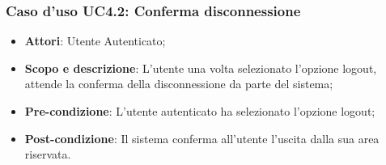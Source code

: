 \subsubsection{Caso d'uso UC4.2: Conferma disconnessione}
	\begin{itemize}
		\item
			\textbf{Attori}: Utente Autenticato;
		\item
			\textbf{Scopo e descrizione}: L'utente una volta selezionato l'opzione logout, attende la conferma della disconnessione da parte del sistema;
 		\item
			\textbf{Pre-condizione}: L'utente autenticato ha selezionato l'opzione logout;
		\item
			\textbf{Post-condizione}: Il sistema conferma all'utente l'uscita dalla sua area riservata.
	\end{itemize}		
	
